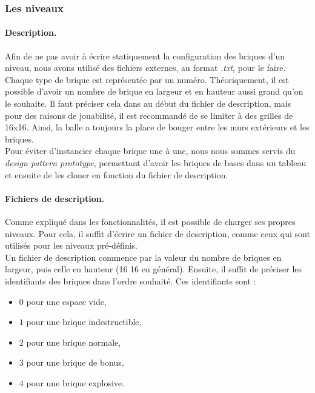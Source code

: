 \documentclass[a4paper,10pt]{article}
\begin{document}
    \subsubsection{Les niveaux}

        \paragraph{Description.} Afin de ne pas avoir à écrire statiquement la configuration des briques d'un niveau, nous avons
        utilisé des fichiers externes, au format \textit{.txt}, pour le faire. Chaque type de brique est représentée par un numéro.
        Théoriquement, il est possible d'avoir un nombre de brique en largeur et en hauteur aussi grand qu'on le souhaite.
        Il faut préciser cela dans au début du fichier de description, mais pour des raisons de jouabilité, il
        est recommandé de se limiter à des grilles de 16x16. Ainsi, la balle a toujours la place de bouger entre les murs
        extérieurs et les briques. \\

        Pour éviter d'instancier chaque brique une à une, nous nous sommes servis du \textit{design pattern prototype},
        permettant d'avoir les briques de bases dans un tableau et ensuite de les cloner en fonction du
        fichier de description.

        \paragraph{Fichiers de description.}
        Comme expliqué dans les fonctionnalités, il est possible de charger ses propres niveaux. Pour cela, il suffit
        d'écrire un fichier de description, comme ceux qui sont utilisés pour les niveaux pré-définis. \\
        Un fichier de description commence par la valeur du nombre de briques en largeur, puis celle en hauteur (16 16
        en général). Ensuite, il suffit de préciser les identifiants des briques dans l'ordre souhaité. Ces identifiants
        sont :
        \begin{itemize}
            \item $0$ pour une espace vide,
            \item $1$ pour une brique indestructible,
            \item $2$ pour une brique normale,
            \item $3$ pour une brique de bonus,
            \item $4$ pour une brique explosive.
        \end{itemize}
\end{document}
